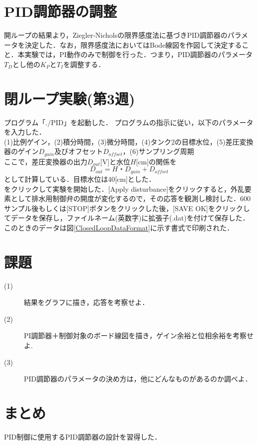 \documentclass[12pt]{jsarticle}
\begin{document}
\section{PID調節器の調整}
開ループの結果より，Ziegler-Nicholsの限界感度法に基づきPID調節器のパラメータを決定した．なお，限界感度法においてはBode線図を作図して決定すること．本実験では，PI動作のみで制御を行った．つまり，PID調節器のパラメータ$T_D$とし他の$K_P$と$T_I$を調整する．
\section{閉ループ実験(第3週)}
プログラム「./PID」を起動した．
プログラムの指示に従い，以下のパラメータを入力した．\\
(1)比例ゲイン，(2)積分時間，(3)微分時間，(4)タンク2の目標水位，(5)差圧変換器のゲイン$D_{gain}$及びオフセット$D_{offset}$，(6)サンプリング周期\\
ここで，差圧変換器の出力$D_{out}$[V]と水位$H$[cm]の関係を
\begin{equation}
  D_{out} = H・D_{gain} + D_{offset}
\end{equation}
として計算している．目標水位は40[cm]とした．\\
[APPLY AND START]をクリックして実験を開始した．[Apply disturbance]をクリックすると，外乱要素として排水用制御弁の開度が変化するので，その応答を観測し検討した．600サンプル後もしくは[STOP]ボタンをクリックした後，[SAVE OK]をクリックしてデータを保存し，ファイルネーム(英数字)に拡張子(.dat)を付けて保存した．このときのデータは図\ref{ClosedLoopDataFormat}に示す書式で印刷された．

\section{課題}
\begin{description}
\item[(1)]結果をグラフに描き，応答を考察せよ．\\
\item[(2)]PI調節器＋制御対象のボード線図を描き，ゲイン余裕と位相余裕を考察せよ.\\
\item[(3)]PID調節器のパラメータの決め方は，他にどんなものがあるのか調べよ．\\
\end{description}

\section{まとめ}
PID制御に使用するPID調節器の設計を習得した．

\begin{thebibliography}{9}
\end{thebibliography}
\end{document}
